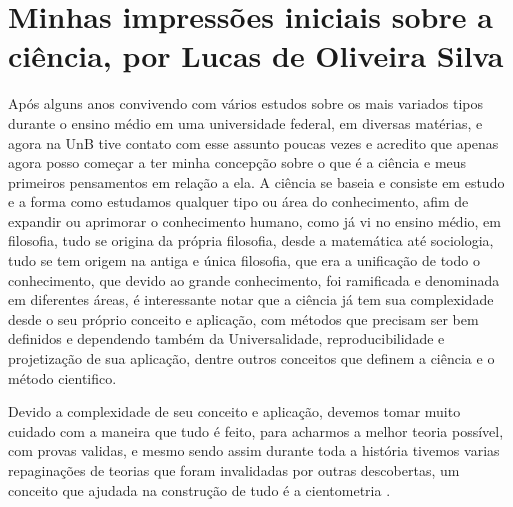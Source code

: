 \section{Minhas impressões iniciais sobre a ciência, por Lucas de Oliveira Silva}

Após alguns anos convivendo com vários estudos sobre os mais variados tipos durante o ensino médio em uma universidade federal, em diversas matérias, e agora na UnB tive contato com esse assunto poucas vezes e acredito que apenas agora posso começar a ter minha concepção sobre o que é a ciência e meus primeiros pensamentos em relação a ela. A ciência se baseia e consiste em estudo e a forma como estudamos qualquer tipo ou área do conhecimento, afim de expandir ou aprimorar o conhecimento humano, como já vi no ensino médio, em filosofia, tudo se origina da própria filosofia, desde a matemática até sociologia, tudo se tem origem na antiga e única filosofia, que era a unificação de todo o conhecimento, que devido ao grande conhecimento, foi ramificada e denominada em diferentes áreas, é interessante notar que a ciência já tem sua complexidade desde o seu próprio conceito e aplicação, com métodos que precisam ser bem definidos e dependendo também da \gls{Universalidade}, reproducibilidade e projetização de sua aplicação, dentre outros conceitos que definem a ciência e o método cientifico.

Devido a complexidade de seu conceito e aplicação, devemos tomar muito cuidado com a maneira que tudo é feito, para acharmos a melhor teoria possível, com provas validas, e mesmo sendo assim durante toda a história tivemos varias repaginações de teorias que foram invalidadas por outras descobertas, um conceito que ajudada na construção de tudo é a cientometria \citep{vinkler_evaluation_2010}.
